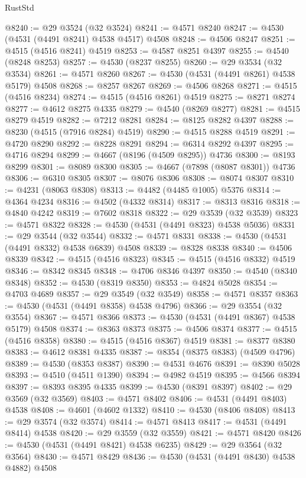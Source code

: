 \begin{lexlean}{RustStd}
\begin{coremodule}
{\begin{coremodule}
{{{{{{{{{{{{{{{{{{{{{{{{{{{{{{{{{{{{{{{{{{{{{{{{{{{{{{{@8240 := @29 @3524 (@32 @3524)
@8241 := @4571 @8240
@8247 := @4530 (@4531 (@4491 @8241) @4538 @4517) @4508
@8248 := @4506 @8247
@8251 := @4515 (@4516 @8241) @4519
@8253 := @4587 @8251 @4397
@8255 := @4540 (@8248 @8253)
@8257 := @4530 (@8237 @8255)
@8260 := @29 @3534 (@32 @3534)
@8261 := @4571 @8260
@8267 := @4530 (@4531 (@4491 @8261) @4538 @5179) @4508
@8268 := @8257 @8267
@8269 := @4506 @8268
@8271 := @4515 (@4516 @8234)
@8274 := @4515 (@4516 @8261) @4519
@8275 := @8271 @8274
@8277 := @4612 @8275 @4335
@8279 := @4540 (@8269 @8277)
@8281 := @4515 @8279 @4519
@8282 := @7212 @8281
@8284 := @8125 @8282 @4397
@8288 := @8230 (@4515 (@7916 @8284) @4519)
@8290 := @4515 @8288 @4519
@8291 := @4720 @8290
@8292 := @8228 @8291
@8294 := @6314 @8292 @4397
@8295 := @4716 @8294
@8299 := @4667 (@8196 (@4509 @8295)) @4736
@8300 := @8193 @8299
@8301 := @8089 @8300
@8305 := @4667 (@7898 (@8087 @8301)) @4736
@8306 := @6310 @8305
@8307 := @8076 @8306
@8308 := @8074 @8307
@8310 := @4231 (@8063 @8308)
@8313 := @4482 (@4485 @1005) @5376
@8314 := @4364 @4234
@8316 := @4502 (@4332 @8314)
@8317 := @8313 @8316
@8318 := @4840 @4242
@8319 := @7602 @8318
@8322 := @29 @3539 (@32 @3539)
@8323 := @4571 @8322
@8328 := @4530 (@4531 (@4491 @8323) @4538 @5036)
@8331 := @29 @3544 (@32 @3544)
@8332 := @4571 @8331
@8338 := @4530 (@4531 (@4491 @8332) @4538 @6839) @4508
@8339 := @8328 @8338
@8340 := @4506 @8339
@8342 := @4515 (@4516 @8323)
@8345 := @4515 (@4516 @8332) @4519
@8346 := @8342 @8345
@8348 := @4706 @8346 @4397
@8350 := @4540 (@8340 @8348)
@8352 := @4530 (@8319 @8350)
@8353 := @4824 @5028
@8354 := @4703 @4689
@8357 := @29 @3549 (@32 @3549)
@8358 := @4571 @8357
@8363 := @4530 (@4531 (@4491 @8358) @4538 @4796)
@8366 := @29 @3554 (@32 @3554)
@8367 := @4571 @8366
@8373 := @4530 (@4531 (@4491 @8367) @4538 @5179) @4508
@8374 := @8363 @8373
@8375 := @4506 @8374
@8377 := @4515 (@4516 @8358)
@8380 := @4515 (@4516 @8367) @4519
@8381 := @8377 @8380
@8383 := @4612 @8381 @4335
@8387 := @8354 (@8375 @8383) (@4509 @4796)
@8389 := @4530 (@8353 @8387)
@8390 := @4531 @4676
@8391 := @8390 @5028
@8393 := @4510 (@4511 @1390)
@8394 := @4982 @4519
@8395 := @4566 @8394
@8397 := @8393 @8395 @4335
@8399 := @4530 (@8391 @8397)
@8402 := @29 @3569 (@32 @3569)
@8403 := @4571 @8402
@8406 := @4531 (@4491 @8403) @4538
@8408 := @4601 (@4602 @1332)
@8410 := @4530 (@8406 @8408)
@8413 := @29 @3574 (@32 @3574)
@8414 := @4571 @8413
@8417 := @4531 (@4491 @8414) @4538
@8420 := @29 @3559 (@32 @3559)
@8421 := @4571 @8420
@8426 := @4530 (@4531 (@4491 @8421) @4538 @6235)
@8429 := @29 @3564 (@32 @3564)
@8430 := @4571 @8429
@8436 := @4530 (@4531 (@4491 @8430) @4538 @4882) @4508
}}}}}}}}}}}}}}}}}}}}}}}}}}}}}}}}}}}}}}}}}}}}}}}}}}}}}}}
\end{coremodule}}
\end{coremodule}
\end{lexlean}
